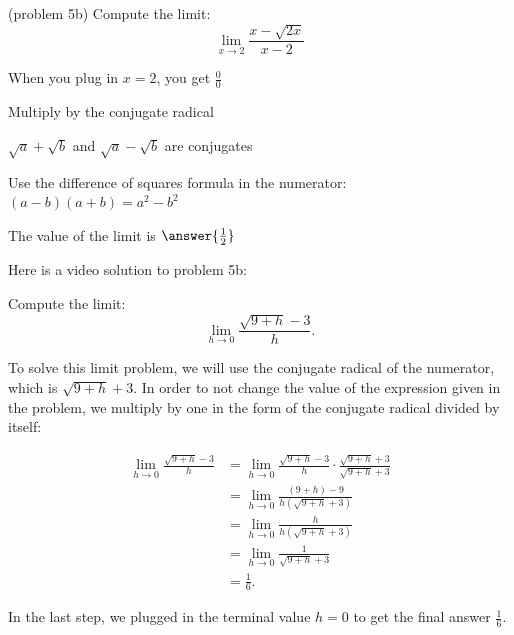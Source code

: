 \documentclass[handout]{ximera}
\begin{document}
\begin{problem}(problem 5b)
  Compute the limit:
  \[
  \lim_{x \to 2} \frac{x- \sqrt{2x}}{x-2}
  \]
  
    \begin{hint}
      When you plug in $x = 2$, you get $\frac00$
    \end{hint}
    \begin{hint}
      Multiply by the conjugate radical
    \end{hint}
    \begin{hint}
      $\sqrt a + \sqrt b$ and $\sqrt a - \sqrt b$ are conjugates
    \end{hint}
    \begin{hint}
      Use the difference of squares formula in the numerator: $(a-b)(a+b) = a^2 - b^2$ 
    \end{hint}
    
		The value of the limit is
		 $\answer{\frac12}$
		
\end{problem}

Here is a video solution to problem 5b:
\begin{foldable}
\end{foldable}



\begin{example}[example 6]
Compute the limit:
\[\lim_{h \to 0} \frac{\sqrt{9+h}-3}{h}.\]

To solve this limit problem, we will use the conjugate radical of the
numerator, which is $\sqrt{9+h}+3$.  In order to not change the value of
the expression given in the problem, we multiply by one in the form of the conjugate radical
divided by itself:



\begin{align*}
\lim_{h \to 0} \frac{\sqrt{9+h}-3}{h} &=
\lim_{h \to 0} \frac{\sqrt{9+h}-3}{h}\cdot \frac{\sqrt{9+h}+3}{\sqrt{9+h}+3} \\[.4 em]
 &= \lim_{h \to 0} \frac{(9+h) - 9}{h(\sqrt{9+h} + 3)} \\[.4 em]
&= \lim_{h \to 0} \frac{h}{h(\sqrt{9+h} + 3)} \\[.4 em]
&= \lim_{h \to 0}\frac{1}{\sqrt{9+h} + 3} \\[.4 em]
&= \frac16.
\end{align*}

In the last step, we plugged in the terminal value $h=0$ to get the final answer $\frac16$.

\end{example}
\end{document}
